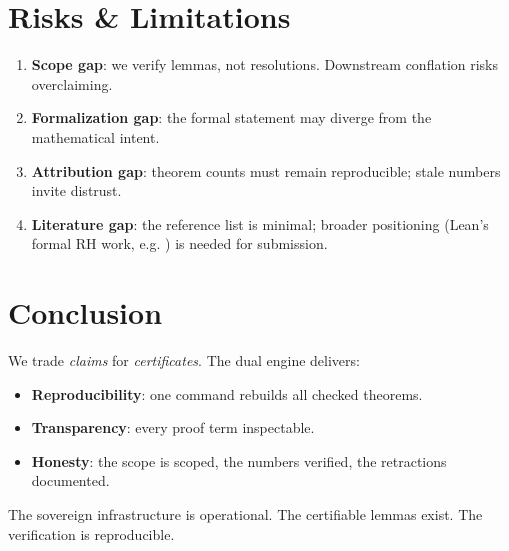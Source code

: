 \documentclass[11pt,a4paper]{article}
\begin{document}
\section{Risks \& Limitations}
\label{sec:risks}

\begin{enumerate}
  \item \textbf{Scope gap}: we verify lemmas, not resolutions. Downstream conflation risks overclaiming.
  \item \textbf{Formalization gap}: the formal statement may diverge from the mathematical intent.
  \item \textbf{Attribution gap}: theorem counts must remain reproducible; stale numbers invite distrust.
  \item \textbf{Literature gap}: the reference list is minimal; broader positioning (Lean's formal RH work, e.g. \cite{contractor2021}) is needed for submission.
\end{enumerate}

\section{Conclusion}
We trade \emph{claims} for \emph{certificates}. The dual engine delivers:
\begin{itemize}
  \item \textbf{Reproducibility}: one command rebuilds all checked theorems.
  \item \textbf{Transparency}: every proof term inspectable.
  \item \textbf{Honesty}: the scope is scoped, the numbers verified, the retractions documented.
\end{itemize}

The sovereign infrastructure is operational. The certifiable lemmas exist. The verification is reproducible.
\end{document}
